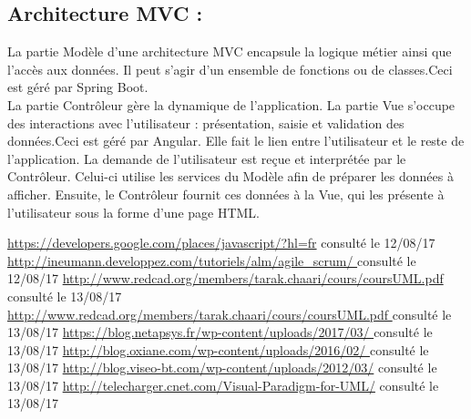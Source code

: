 \documentclass{article}
\begin{document}
\subsection*{Architecture MVC : }
La partie Modèle d’une architecture MVC encapsule la logique métier ainsi que l’accès aux données. Il peut s’agir d’un ensemble de fonctions ou de classes.Ceci est géré par Spring Boot.\\
La partie Contrôleur gère la dynamique de l’application. La partie Vue s’occupe des interactions avec l’utilisateur : présentation, saisie et validation des données.Ceci est géré par Angular.
 Elle fait le lien entre l’utilisateur et le reste de l’application.
La demande de l’utilisateur est reçue et interprétée par le Contrôleur. Celui-ci utilise les services du Modèle afin de préparer les données à afficher. Ensuite, le Contrôleur fournit ces données à la Vue, qui les présente à l’utilisateur sous la forme d’une page HTML.
\label{sec:hello4}
\cleardoublepage

\begin{thebibliography}{1}
 \textcolor{blue}{\url{https://developers.google.com/places/javascript/?hl=fr}} consulté le 12/08/17
 \textcolor{blue}{\url{ http://ineumann.developpez.com/tutoriels/alm/agile_scrum/ }} consulté le 12/08/17
 \textcolor{blue}{\url{http://www.redcad.org/members/tarak.chaari/cours/coursUML.pdf }} consulté le 13/08/17
 \textcolor{blue}{\url{http://www.redcad.org/members/tarak.chaari/cours/coursUML.pdf }} consulté le 13/08/17
 \textcolor{blue}{\url{https://blog.netapsys.fr/wp-content/uploads/2017/03/ }} consulté le 13/08/17
 \textcolor{blue}{\url{http://blog.oxiane.com/wp-content/uploads/2016/02/ }} consulté le 13/08/17
 \textcolor{blue}{\url{http://blog.viseo-bt.com/wp-content/uploads/2012/03/}} consulté le 13/08/17
 \textcolor{blue}{\url{http://telecharger.cnet.com/Visual-Paradigm-for-UML/}} consulté le 13/08/17
\end{thebibliography}
\end{document}
